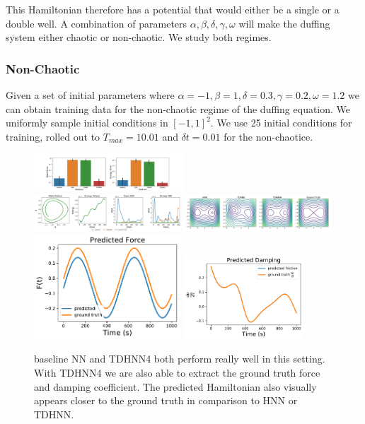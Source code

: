 \documentclass[twoside]{article}
\begin{document}
This Hamiltonian therefore has a potential that would either be a single or a double well. A combination of parameters $\alpha,\beta,\delta,\gamma,\omega$ will make the duffing system either chaotic or non-chaotic. We study both regimes.

\subsubsection{Non-Chaotic}

Given a set of initial parameters where $\alpha =-1,\beta=1,\delta=0.3,\gamma=0.2,\omega=1.2$ we can obtain training data for the non-chaotic regime of the duffing equation. We uniformly sample initial conditions in $[-1,1]^2$. We use 25 initial conditions for training, rolled out to $T_{max}=10.01$ and $\delta t =0.01$ for the non-chaotice. 


\begin{figure}[h!]
\centering
\includegraphics[width=0.5\textwidth]{figures/duffing_1_errors.pdf}
\includegraphics[width=0.49\textwidth]{figures/duffing_1_pred.pdf}
\includegraphics[width=0.49\textwidth]{figures/duffing_ham_1.pdf}
\includegraphics[width=0.49\textwidth]{figures/TDHNN4_duffing_1.pdf}
\includegraphics[width=0.4\textwidth]{figures/TDHNN4_duffing_damp_1.pdf}
\caption{baseline NN and TDHNN4 both perform really well in this setting. With TDHNN4 we are also able to extract the ground truth force and damping coefficient. The predicted Hamiltonian also visually appears closer to the ground truth in comparison to HNN or TDHNN.}
\end{figure}
\end{document}
